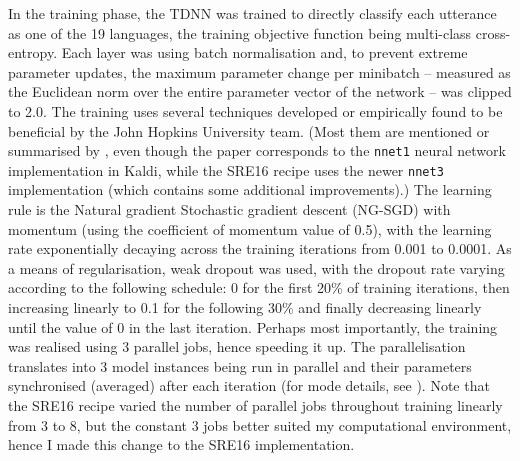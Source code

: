 \documentclass[bsc,frontabs,twoside,singlespacing,parskip,deptreport]{infthesis}
\begin{document}
{{{      %
      In the training phase, the TDNN was trained to directly classify each utterance as one of the 19 languages, the training objective function being multi-class cross-entropy.
      Each layer was using batch normalisation and, to prevent extreme parameter updates, the maximum parameter change per minibatch -- measured as the Euclidean norm over the entire parameter vector of the network -- was clipped to 2.0.
      The training uses several techniques developed or empirically found to be beneficial by the John Hopkins University team. (Most them are mentioned or summarised by \citet{Povey_et_al_2014}, even though the paper corresponds to the \verb|nnet1| neural network implementation in Kaldi, while the SRE16 recipe uses the newer \verb|nnet3| implementation (which contains some additional improvements).) The learning rule is the Natural gradient Stochastic gradient descent (NG-SGD) with momentum (using the coefficient of momentum value of 0.5), with the learning rate exponentially decaying across the training iterations from 0.001 to 0.0001. As a means of regularisation, weak dropout was used, with the dropout rate varying according to the following schedule: 0 for the first 20\% of training iterations, then increasing linearly to 0.1 for the following 30\% and finally decreasing linearly until the value of 0 in the last iteration.
      Perhaps most importantly, the training was realised using 3 parallel jobs, hence speeding it up. The parallelisation translates into 3 model instances being run in parallel and their parameters synchronised (averaged) after each iteration (for mode details, see \citeauthor{Povey_et_al_2014}). Note that the SRE16 recipe varied the number of parallel jobs throughout training linearly from 3 to 8, but the constant 3 jobs better suited my computational environment, hence I made this change to the SRE16 implementation.

}}}
\end{document}
